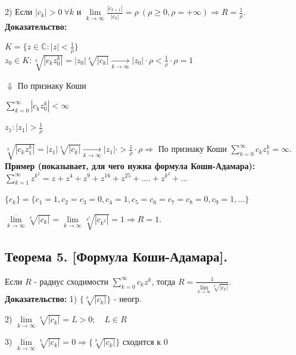 \documentclass[a4paper,12pt]{article} %
\begin{document}
 2) Если $|c_k| > 0 \  \forall k \text{ и } \lim\limits_{k \to \infty} \frac{|c_{k+1}|}{|c_k|} = \rho \ (\rho \geqslant 0, \rho = +\infty) \Rightarrow R = \frac{1}{\rho}$.\\

 \textbf{Доказательство:}

 $K = \{z \in \mathbb{C}: |z| < \frac{1}{\rho} \}$ \\

 $z_0 \in K: \sqrt[k]{|c_k z_0^k|} = |z_0| \sqrt[k]{|c_k|} \underset{k \to \infty}{\longrightarrow} |z_0| \cdot \rho < \frac{1}{\rho} \cdot \rho = 1 $
 
\hspace*{3 cm} $\Downarrow$ По признаку Коши

\hspace*{3 cm}$\sum\limits_{k = 0}^\infty |c_k z_0^k| < \infty$

$z_1: |z_1| > \frac{1}{\rho}$

$\sqrt[k]{|c_k z_1^k|} = |z_1| \sqrt[k]{|c_k|} \underset{k \to \infty}{\longrightarrow} |z_1| \cdot > \frac{1}{\rho} \cdot \rho \Rightarrow
$ По признаку Коши $\sum\limits_{k = 0}^\infty c_k z_1^k = \infty$.\\

\textbf{Пример (показывает, для чего нужна формула Коши-Адамара):}\\
$\sum\limits_{k = 1}^\infty z^{k^2} = z + z^4 + z^9 + z^{16} + z^{25} + .... + z^{k^2} + ...
$

$ \{c_k\} = \{ c_1 = 1, c_2 = c_3 = 0, c_4 = 1, c_5 = c_6 = c_7 = c_8 = 0, c_9 = 1, ... \} $

$\overline{\lim\limits_{k \to \infty}} \sqrt[k]{|c_k|} = \lim\limits_{k \to \infty} \sqrt[k^2]{|c_{k^2}|} = 1 \Rightarrow R = 1$.\\ 

\subsection{Теорема 5. [Формула Коши-Адамара].}
Если $R$ - радиус сходимости $\sum\limits_{k = 0}^\infty c_k z^k$, тогда $ R = \frac{1}{\overline{\lim\limits_{k \to \infty}} \sqrt[k]{|c_k|}} $.\\

\textbf{Доказательство:}
1) $ \{ \sqrt[k]{|c_k|}\} $ - неогр.

2) $ \overline{\lim\limits_{k \to \infty} }\sqrt[k]{|c_k|}  = L > 0; \quad L \in R$

3) $ \overline{\lim\limits_{k \to \infty} }\sqrt[k]{|c_k|}  = 0 \Rightarrow \{ \sqrt[k]{|c_k|}\}$ сходится к 0
\end{document}
